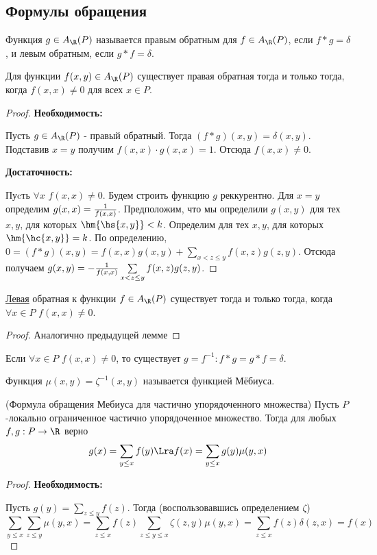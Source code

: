 \documentclass[unicode, 10pt, a4paper, oneside, fleqn]{article}
\begin{document}
\subsection{Формулы обращения}
\begin{df}
  Функция $g\in\arp$ называется правым обратным для $f\in\arp$, если $f\ast g=\delta$, 
  и левым обратным, если $g\ast f=\delta$.
\end{df}
\begin{lemma}
  Для функции $f(x,y)\in\arp$ существует правая обратная тогда и только тогда, когда $f(x,x) \neq 0$ для всех $x\in P$.
\end{lemma}
\begin{proof}
  {\bf Необходимость:\par}
  Пусть $g\in\arp$ - правый обратный. Тогда $(f\ast g)(x,y) = \delta(x,y)$. Подставив $x=y$ получим $\displaystyle f(x,x)\cdot g(x,x) = 1$.
  Отсюда $f(x,x)\neq 0$.\par
  {\bf Достаточность:\par}
  Пуcть $\forall x$ $ f(x,x)\neq 0$. Будем строить функцию  $g$ реккурентно.
  Для  $x=y$ определим $g(x,x)=\frac{1}{f(x,x)}$.
  Предположим, что мы определили $g(x,y)$ для тех $x,y$, для которых $\hm{\hs{x,y}}<k$.
  Определим для тех $x,y$, для которых $\hm{\hc{x,y}}=k$. По определению,
  $\displaystyle 0 = (f\ast g)(x,y) = f(x,x)g(x,y)+\sum\limits_{x<z\le y} f(x,z)g(z,y)$.
  Отсюда получаем $g(x,y) = -\frac{1}{f(x,x)}\sum\limits_{x<z\le y}f(x,z)g(z,y)$.
\end{proof}
\begin{lemma}
  \underline{Левая} обратная к функции $f\in\arp$ существует тогда и только тогда, когда
  $\forall x\in P$ $f(x,x)\neq 0$.
\end{lemma}
\begin{proof}
  {Аналогично предыдущей лемме}
\end{proof}
\begin{imp}
  Если $\forall x\in P$ $f(x,x)\neq 0$, то существует $\displaystyle g=f^{-1}: f\ast g=g\ast f=\delta$.
\end{imp}
\begin{df}
  Функция $\mu(x,y)=\zeta^{-1}(x,y)$ называется функцией Мёбиуса.
\end{df}
\begin{theorem}(Формула обращения Мебиуса для частично упорядоченного множества)
  Пусть $P$-локально ограниченное частично упорядоченное множество. Тогда
  для любых $f,g: P\to\R$ верно 
  \begin{displaymath}
    g(x)=\sum_{y\le x}f(y) \Lra f(x) = \sum_{y\le x}g(y)\mu(y,x)
  \end{displaymath}
\end{theorem}
\begin{proof}
  {\bf Необходимость:\par}
  Пусть $\displaystyle g(y)=\sum_{z\le y}f(z)$. Тогда (воспользовавшись определением $\zeta$)
  \begin{displaymath}
    \sum_{y\le x}\sum_{z\le y}\mu(y,x) = \sum_{z\le x}f(z)\sum_{z\le y\le x}\zeta(z,y)\mu(y,x) =
    \sum_{z\le x}f(z)\delta(z,x) = f(x)
  \end{displaymath}
\end{proof}
\end{document}
